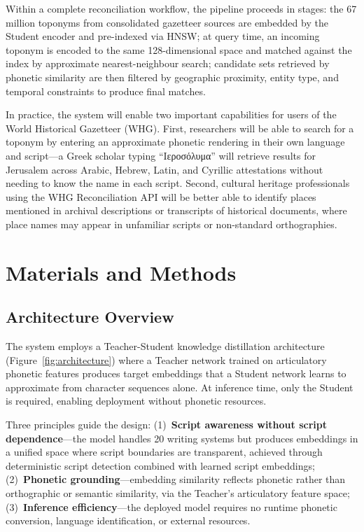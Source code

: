 \documentclass[11pt,a4paper]{article}
\begin{document}
Within a complete reconciliation workflow, the pipeline proceeds in stages: the 67 million toponyms from consolidated gazetteer sources are embedded by the Student encoder and pre-indexed via HNSW; at query time, an incoming toponym is encoded to the same 128-dimensional space and matched against the index by approximate nearest-neighbour search; candidate sets retrieved by phonetic similarity are then filtered by geographic proximity, entity type, and temporal constraints to produce final matches.

In practice, the system will enable two important capabilities for users of the World Historical Gazetteer (WHG). First, researchers will be able to search for a toponym by entering an approximate phonetic rendering in their own language and script---a Greek scholar typing ``Ιεροσόλυμα'' will retrieve results for Jerusalem across Arabic, Hebrew, Latin, and Cyrillic attestations without needing to know the name in each script. Second, cultural heritage professionals using the WHG Reconciliation API will be better able to identify places mentioned in archival descriptions or transcripts of historical documents, where place names may appear in unfamiliar scripts or non-standard orthographies.


\section{Materials and Methods}
\label{sec:methods}

\subsection{Architecture Overview}

The system employs a Teacher-Student knowledge distillation architecture~\citep{hinton2015distilling} (Figure~\ref{fig:architecture}) where a Teacher network trained on articulatory phonetic features produces target embeddings that a Student network learns to approximate from character sequences alone. At inference time, only the Student is required, enabling deployment without phonetic resources.

Three principles guide the design: (1)~\textbf{Script awareness without script dependence}---the model handles 20 writing systems but produces embeddings in a unified space where script boundaries are transparent, achieved through deterministic script detection combined with learned script embeddings; (2)~\textbf{Phonetic grounding}---embedding similarity reflects phonetic rather than orthographic or semantic similarity, via the Teacher's articulatory feature space; (3)~\textbf{Inference efficiency}---the deployed model requires no runtime phonetic conversion, language identification, or external resources.
\end{document}

